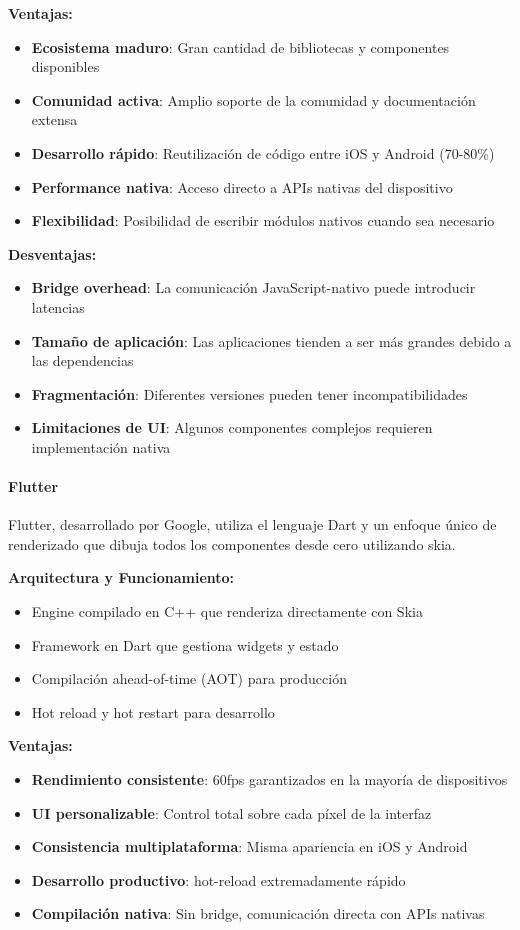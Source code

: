 \textbf{Ventajas:}
\begin{itemize}
    \item \textbf{Ecosistema maduro}: Gran cantidad de bibliotecas y componentes disponibles
    \item \textbf{Comunidad activa}: Amplio soporte de la comunidad y documentación extensa
    \item \textbf{Desarrollo rápido}: Reutilización de código entre iOS y Android (70-80\%)
    \item \textbf{Performance nativa}: Acceso directo a APIs nativas del dispositivo
    \item \textbf{Flexibilidad}: Posibilidad de escribir módulos nativos cuando sea necesario
\end{itemize}

\textbf{Desventajas:}
\begin{itemize}
    \item \textbf{Bridge overhead}: La comunicación JavaScript-nativo puede introducir latencias
    \item \textbf{Tamaño de aplicación}: Las aplicaciones tienden a ser más grandes debido a las dependencias
    \item \textbf{Fragmentación}: Diferentes versiones pueden tener incompatibilidades
    \item \textbf{Limitaciones de UI}: Algunos componentes complejos requieren implementación nativa
\end{itemize}

\paragraph{Flutter}

Flutter, desarrollado por Google, utiliza el lenguaje Dart y un enfoque único de renderizado que dibuja todos los componentes desde cero utilizando \gls{skia}.

\textbf{Arquitectura y Funcionamiento:}
\begin{itemize}
    \item Engine compilado en C++ que renderiza directamente con Skia
    \item Framework en Dart que gestiona widgets y estado
    \item Compilación \gls{ahead-of-time} (AOT) para producción
    \item Hot reload y hot restart para desarrollo
\end{itemize}

\textbf{Ventajas:}
\begin{itemize}
    \item \textbf{Rendimiento consistente}: 60\acrshort{fps} garantizados en la mayoría de dispositivos
    \item \textbf{UI personalizable}: Control total sobre cada píxel de la interfaz
    \item \textbf{Consistencia multiplataforma}: Misma apariencia en iOS y Android
    \item \textbf{Desarrollo productivo}: \Gls{hot-reload} extremadamente rápido
    \item \textbf{Compilación nativa}: Sin bridge, comunicación directa con APIs nativas
\end{itemize}


